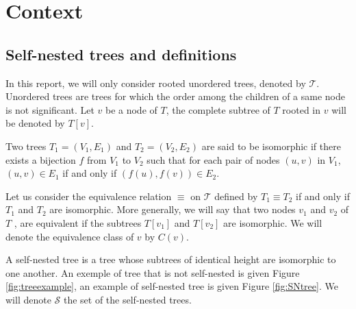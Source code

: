 \section{Context}
\label{sec:context}
\subsection{Self-nested trees and definitions}

In this report, we will only consider rooted unordered trees, %
denoted by $\mathcal{T}$. Unordered trees are trees for
which the order among the children of a same node is not significant.
Let $v$ be a node of $T$, the complete subtree of $T$ rooted in $v$ will be
denoted by $T[v]$.

Two trees $T_{1} = (V_{1},E_{1})$ and  $T_{2} = (V_{2},E_{2})$ are
said to be isomorphic if there exists a bijection $f$ from  
$V_{1}$ to  $V_{2}$ such that for each pair of nodes $(u,v)$ in  $V_{1}$,
$(u,v) \in E_{1}$ if and only if $(f(u),f(v)) \in E_{2}$.

Let us consider the equivalence relation $\equiv$ on $\mathcal{T}$
defined by $T_1 \equiv T_2$ if and only if $T_1$ and $T_2$ are
isomorphic. More generally, we will say that two nodes $v_1$ and 
$v_2$ of $T$ , are equivalent if the subtrees
$T[v_1]$ and $T[v_2]$ are isomorphic. We will denote the
equivalence class of $v$ by $C(v)$.

A self-nested tree is a tree whose subtrees of identical height are
isomorphic to one another. An exemple of tree that is not self-nested
is given Figure \ref{fig:treeexample}, an example of self-nested tree is given
Figure \ref{fig:SNtree}.  We will denote $\mathcal{S}$
the set of the self-nested trees.

